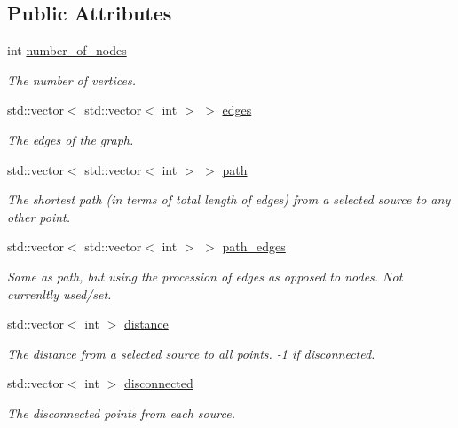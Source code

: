\subsection*{Public Attributes}
\begin{DoxyCompactItemize}
\item 
int \hyperlink{classMackey_1_1Graph_a6b275a20b0571d4b51fbfa3e596cd67a}{number\+\_\+of\+\_\+nodes}
\begin{DoxyCompactList}\small\item\em The number of vertices. \end{DoxyCompactList}\item 
std\+::vector$<$ std\+::vector$<$ int $>$ $>$ \hyperlink{classMackey_1_1Graph_a729ec24b9f9e504f4c4e2d3f6e2cab83}{edges}
\begin{DoxyCompactList}\small\item\em The edges of the graph. \end{DoxyCompactList}\item 
std\+::vector$<$ std\+::vector$<$ int $>$ $>$ \hyperlink{classMackey_1_1Graph_a66fac95e623ca6e3e85ec33310755831}{path}
\begin{DoxyCompactList}\small\item\em The shortest path (in terms of total length of edges) from a selected source to any other point. \end{DoxyCompactList}\item 
std\+::vector$<$ std\+::vector$<$ int $>$ $>$ \hyperlink{classMackey_1_1Graph_ae704812b28d290b7d3742ea3745b5edf}{path\+\_\+edges}
\begin{DoxyCompactList}\small\item\em Same as path, but using the procession of edges as opposed to nodes. Not currenltly used/set. \end{DoxyCompactList}\item 
std\+::vector$<$ int $>$ \hyperlink{classMackey_1_1Graph_a0de605e2b229c560932e8cb5a2866339}{distance}
\begin{DoxyCompactList}\small\item\em The distance from a selected source to all points. -\/1 if disconnected. \end{DoxyCompactList}\item 
std\+::vector$<$ int $>$ \hyperlink{classMackey_1_1Graph_a1ac2413768ead078e79b8f1c96d815e5}{disconnected}
\begin{DoxyCompactList}\small\item\em The disconnected points from each source. \end{DoxyCompactList}\end{DoxyCompactItemize}
